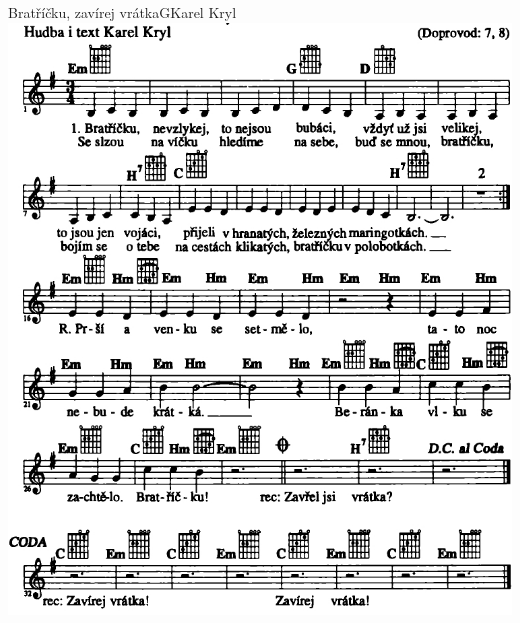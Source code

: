\setcounter{page}{11}
\begin{song}{Bratříčku, zavírej vrátka}{G}{Karel Kryl}
\includegraphics[width=\textwidth]{noty/a_bratříčku-zavírej-vrátka} \end{song} \pagebreak

